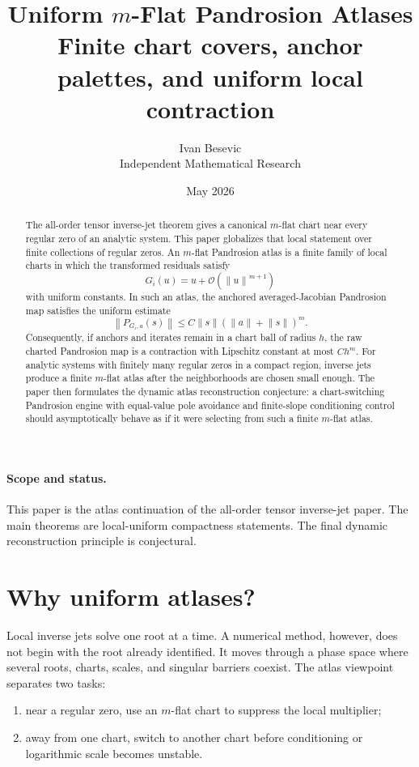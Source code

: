 \documentclass[11pt]{article}
\title{Uniform \(m\)-Flat Pandrosion Atlases\\[3pt]
\large Finite chart covers, anchor palettes, and uniform local contraction}
\author{Ivan Besevic\\Independent Mathematical Research}
\date{May 2026}
\newcommand{\Oterm}{\mathcal O}
\newcommand{\norm}[1]{\left\lVert #1\right\rVert}
\begin{document}
\maketitle

\begin{abstract}
The all-order tensor inverse-jet theorem gives a canonical \(m\)-flat chart near every regular zero of an analytic system. This paper globalizes that local statement over finite collections of regular zeros. An \(m\)-flat Pandrosion atlas is a finite family of local charts in which the transformed residuals satisfy
\[
        G_i(u)=u+\Oterm(\norm{u}^{m+1})
\]
with uniform constants. In such an atlas, the anchored averaged-Jacobian Pandrosion map satisfies the uniform estimate
\[
        \norm{P_{G_i,a}(s)}
        \le
        C\norm{s}(\norm{a}+\norm{s})^m.
\]
Consequently, if anchors and iterates remain in a chart ball of radius \(h\), the raw charted Pandrosion map is a contraction with Lipschitz constant at most \(C h^m\). For analytic systems with finitely many regular zeros in a compact region, inverse jets produce a finite \(m\)-flat atlas after the neighborhoods are chosen small enough. The paper then formulates the dynamic atlas reconstruction conjecture: a chart-switching Pandrosion engine with equal-value pole avoidance and finite-slope conditioning control should asymptotically behave as if it were selecting from such a finite \(m\)-flat atlas.
\end{abstract}

\paragraph{Scope and status.}
This paper is the atlas continuation of the all-order tensor inverse-jet paper. The main theorems are local-uniform compactness statements. The final dynamic reconstruction principle is conjectural.

\section{Why uniform atlases?}

Local inverse jets solve one root at a time. A numerical method, however, does not begin with the root already identified. It moves through a phase space where several roots, charts, scales, and singular barriers coexist. The atlas viewpoint separates two tasks:
\begin{enumerate}[label=(\roman*)]
\item near a regular zero, use an \(m\)-flat chart to suppress the local multiplier;
\item away from one chart, switch to another chart before conditioning or logarithmic scale becomes unstable.
\end{enumerate}
\end{document}
